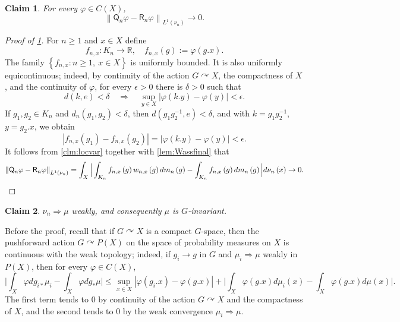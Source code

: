 \documentclass{amsart}
\numberwithin{equation}{subsection}
\theoremstyle{plain}
\theoremstyle{definition}
\theoremstyle{plain}
\newtheorem{claim}[claim]{Claim}
\begin{document}
\begin{claim}\label{clm:QRclos}
For every \(\varphi\in C\left(X\right)\),
\[\left\|\mathsf{Q}_{n}\varphi-\mathsf{R}_{n}\varphi\right\|_{L^{1}\left(\nu_{n}\right)}\to0.\]
\end{claim}

\begin{proof}[Proof of \cref{clm:QRclos}]
For \(n\geq 1\) and \(x\in X\) define
\[f_{n,x}:K_{n}\to\mathbb{R},\quad f_{n,x}\left(g\right):=\varphi\left(g.x\right).\]
The family \(\left\{f_{n,x}:n\geq1,\ x\in X\right\}\) is uniformly bounded. It is also uniformly equicontinuous; indeed, by continuity of the action \(G\curvearrowright X\), the compactness of \(X\), and the continuity of \(\varphi\), for every \(\epsilon>0\) there is \(\delta>0\) such that
\[d\left(k,e\right)<\delta\quad\Longrightarrow\quad\sup_{y\in X}\left|\varphi\left(k.y\right)-\varphi\left(y\right)\right|<\epsilon.\]
If \(g_{1},g_{2}\in K_{n}\) and \(d_{n}\left(g_{1},g_{2}\right)<\delta\), then \(d\left(g_{1}g_{2}^{-1},e\right)<\delta\), and with \(k=g_{1}g_{2}^{-1}\), \(y=g_{2}.x\), we obtain
\[\left|f_{n,x}\left(g_{1}\right)-f_{n,x}\left(g_{2}\right)\right|=\left|\varphi\left(k.y\right)-\varphi\left(y\right)\right|<\epsilon.\]
It follows from \cref{clm:locvar} together with \cref{lem:Wassfinal} that
\[\left\|\mathsf{Q}_{n}\varphi-\mathsf{R}_{n}\varphi\right\|_{L^{1}\left(\nu_{n}\right)}=\int_{X}\Big|\int_{K_{n}}f_{n,x}\left(g\right)w_{n,x}\left(g\right)dm_{n}\left(g\right)-\int_{K_{n}}f_{n,x}\left(g\right)dm_{n}\left(g\right)\Big|d\nu_{n}\left(x\right)\to0.\qedhere\]
\end{proof}

\begin{claim}\label{clm:weakconv}
\(\nu_{n}\Rightarrow\mu\) weakly, and consequently \(\mu\) is \(G\)-invariant.
\end{claim}

Before the proof, recall that if \(G\curvearrowright X\) is a compact \(G\)-space, then the pushforward action \(G\curvearrowright P\left(X\right)\) on the space of probability measures on \(X\) is continuous with the weak topology; indeed, if \(g_{i}\to g\) in \(G\) and \(\mu_{i}\Rightarrow\mu\) weakly in \(P\left(X\right)\), then for every \(\varphi\in C\left(X\right)\),
\[\Big|\int_{X}\varphi dg_{i\ast}\mu_{i}-\int_{X}\varphi dg_{\ast}\mu\Big|\leq\sup_{x\in X}\left|\varphi\left(g_{i}.x\right)-\varphi\left(g.x\right)\right|+\Big|\int_{X}\varphi\left(g.x\right)d\mu_{i}\left(x\right)-\int_{X}\varphi\left(g.x\right)d\mu\left(x\right)\Big|.\]
The first term tends to \(0\) by continuity of the action \(G\curvearrowright X\) and the compactness of \(X\), and the second tends to \(0\) by the weak convergence \(\mu_{i}\Rightarrow\mu\).
\end{document}
